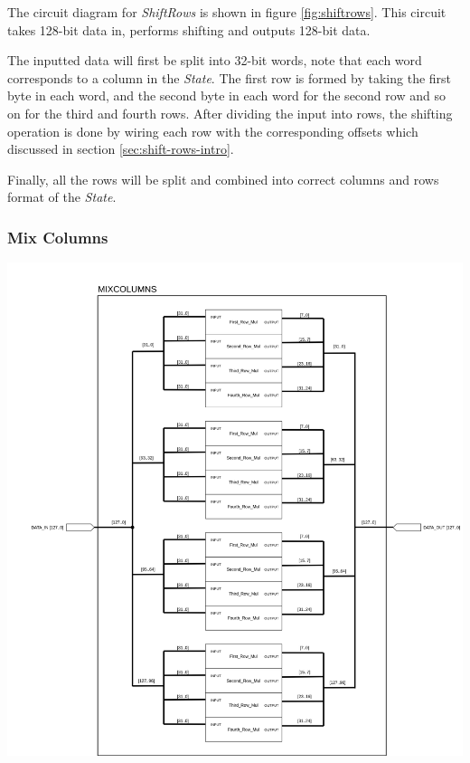 \documentclass[a4paper, 10pt]{article}
\newenvironment{Figure}
    {\par\medskip\noindent\minipage{\linewidth}}
    {\endminipage\par\medskip}
\begin{document}
\begin{multicols}{2}
            The circuit diagram for \textit{ShiftRows} is shown in figure \ref{fig:shiftrows}. This circuit takes 128-bit data in, performs shifting and outputs 128-bit data.

            The inputted data will first be split into 32-bit words, note that each word corresponds to a column in the \textit{State}. The first row is formed by taking the first byte in each word, and the second byte in each word for the second row and so on for the third and fourth rows. After dividing the input into rows, the shifting operation is done by wiring each row with the corresponding offsets which discussed in section \ref{sec:shift-rows-intro}.

            Finally, all the rows will be split and combined into correct columns and rows format of the \textit{State}.

            \subsubsection{Mix Columns}

            \noindent
            \begin{Figure}
                \centering
                \includegraphics[width=\linewidth]{MixColumns.png}
                \label{fig:mixcolumns}
            \end{Figure}


\end{multicols}
\end{document}
